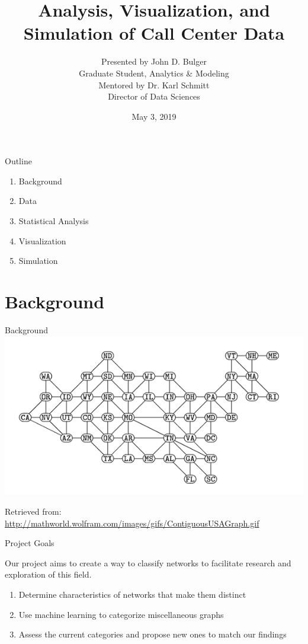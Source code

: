 \documentclass{beamer}
\title[Call Center Analysis]{Analysis, Visualization, and Simulation of Call Center Data} %
\author[Bulger \and Schmitt]{Presented by John D. Bulger\\ Graduate Student, Analytics \& Modeling
\\ \vskip0.1in Mentored by Dr. Karl Schmitt\\ Director of Data Sciences}
\institute[VERUM]{Valparaiso University}
\date{May 3, 2019}
\begin{document}
\begin{frame}
\titlepage
\end{frame}


\begin{frame}{Outline}
\begin{enumerate}
    \item Background
    \medskip
    \item Data
    \medskip
    \item Statistical Analysis
    \medskip
    \item Visualization
    \medskip
    \item Simulation
\end{enumerate}
\end{frame}





\section{Background}


\begin{frame}{Background}
    \centering
    \includegraphics[scale=0.5]{contiguous-usa-graph}
    
    \tiny Retrieved from:  \url{http://mathworld.wolfram.com/images/gifs/ContiguousUSAGraph.gif}
    
\end{frame}



\begin{frame}{Project Goals}

\begin{center}
Our project aims to create a way to classify networks to facilitate research and exploration of this field.
\end{center}
\begin{enumerate}
    \item Determine characteristics of networks that make them distinct 
     \item Use machine learning to categorize miscellaneous graphs
     \item Assess the current categories and propose new ones to match our findings
  
\end{enumerate}
\end{frame}
\end{document}
